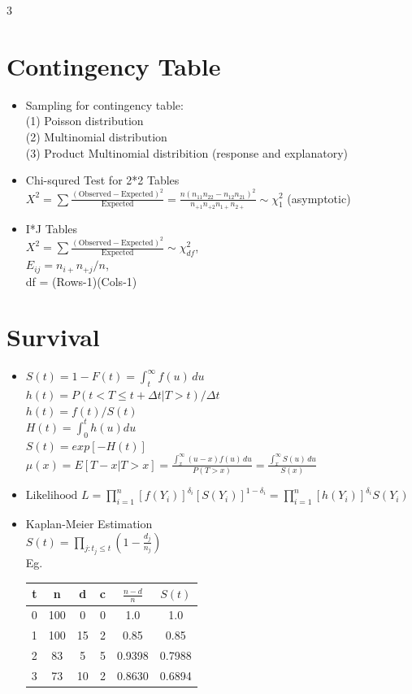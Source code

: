 \documentclass[a4paper,10pt]{article}
\begin{document}
\begin{multicols}{3}
\section*{Contingency Table}
\begin{itemize}
    \item Sampling for contingency table: \\
    (1) Poisson distribution\\
    (2) Multinomial distribution\\
    (3) Product Multinomial distribition (response and explanatory)
    \item Chi-squred Test for 2*2 Tables\\
    $X^2 = \sum \frac{(\text{Observed} - \text{Expected})^2}{\text{Expected}}= \frac{n (n_{11} n_{22} - n_{12} n_{21})^2}{n_{+1} n_{+2} n_{1+} n_{2+}}\sim \chi_1^2$ (asymptotic)
    \item I*J Tables\\
    $X^2 = \sum \frac{(\text{Observed} - \text{Expected})^2}{\text{Expected}}\sim \chi^2_{df}$,\\ $E_{ij}=n_{i+}n_{+j}/n$, \\df = (Rows-1)(Cols-1)
\end{itemize}

\section*{Survival}
\begin{itemize}
    \item $S(t) = 1 - F(t)  = \int_t^\infty f(u) \, du$\\
    $h(t)=P(t<T\le t+\Delta t|T>t)/\Delta t$\\
    $h(t)=f(t)/S(t)$\\
    $H(t)=\int_0^th(u)du$\\
    $S(t)=exp[-H(t)]$\\
    $\mu(x)= E[T-x|T>x]= \frac{\int_x^\infty (u-x) f(u) \, du}{P(T > x)} = \frac{\int_x^\infty S(u) \, du}{S(x)}$
    \item $\text{Likelihood } L = \prod_{i=1}^n \left[ f(Y_i) \right]^{\delta_i} \left[ S(Y_i) \right]^{1-\delta_i} = \prod_{i=1}^n \left[ h(Y_i) \right]^{\delta_i} S(Y_i)$
    \item Kaplan-Meier Estimation\\
    $S(t) = \prod_{j : t_j \leq t} \left( 1 - \frac{d_j}{n_j} \right)$ \\Eg.

    \begin{tabular}{|c|c|c|c|c|c|}
    \hline
    \textbf{t} & \textbf{n} & \textbf{d} & \textbf{c} & $\frac{n-d}{n}$ & $S(t)$ \\ \hline
    0 & 100 & 0  & 0 & 1.0   & 1.0   \\ \hline
    1 & 100 & 15 & 2 & 0.85  & 0.85  \\ \hline
    2 & 83  & 5  & 5 & 0.9398 & 0.7988 \\ \hline
    3 & 73  & 10 & 2 & 0.8630 & 0.6894 \\ \hline
    \end{tabular}




\end{itemize}
\end{multicols}
\end{document}
